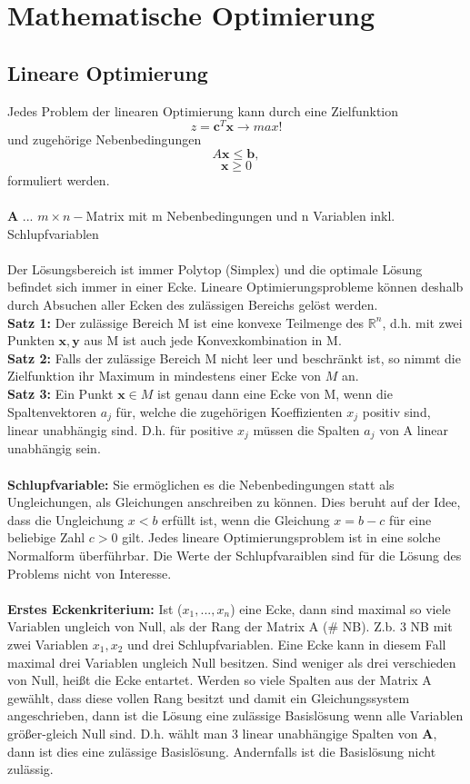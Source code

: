 \section{Mathematische Optimierung}
	\subsection{Lineare Optimierung}
		Jedes Problem der linearen Optimierung kann durch eine Zielfunktion
		\[z = \bm{c}^{T}\bm{x}\rightarrow max!\]
		und zugehörige Nebenbedingungen
		\[A\bm{x} \leq \bm{b},\]
		\[\bm{x} \geq 0\]
		formuliert werden.\\\\
		\tab[1cm] \textbf{A} \tab ... \tab $ m\times n- $Matrix mit m Nebenbedingungen und n Variablen inkl. Schlupfvariablen
		\leavevmode \\\\
		Der Lösungsbereich ist immer Polytop (Simplex) und die optimale Lösung befindet sich immer in einer Ecke. Lineare Optimierungsprobleme können deshalb durch Absuchen aller Ecken des zulässigen Bereichs gelöst werden.\\
		\textbf{Satz 1:} Der zulässige Bereich M ist eine konvexe Teilmenge des $ \mathbb{R}^{n} $, d.h. mit zwei Punkten $ \bm{x,y} $ aus M ist auch jede Konvexkombination in M.\\
		\textbf{Satz 2:} Falls der zulässige Bereich M nicht leer und beschränkt ist, so nimmt die Zielfunktion ihr Maximum in mindestens einer Ecke von $ M $ an. \\
		\textbf{Satz 3:} Ein Punkt $ \bm{x} \in M $ ist genau dann eine Ecke von M, wenn die Spaltenvektoren $ a_{j} $ für, welche die zugehörigen Koeffizienten $ x_{j} $ positiv sind, linear unabhängig sind. D.h. für positive $ x_{j} $ müssen die Spalten $ a_{j} $ von A linear unabhängig sein.
		\leavevmode \\\\
		\textbf{Schlupfvariable:} Sie ermöglichen es die Nebenbedingungen statt als Ungleichungen, als Gleichungen anschreiben zu können. Dies beruht auf der Idee, dass die Ungleichung $ x<b $ erfüllt ist, wenn die Gleichung $ x=b-c $ für eine beliebige Zahl $ c>0 $ gilt. Jedes lineare Optimierungsproblem ist in eine solche Normalform überführbar. Die Werte der Schlupfvaraiblen sind für die Lösung des Problems nicht von Interesse.
		\leavevmode \\\\
		\textbf{Erstes Eckenkriterium:} Ist ($ x_{1}, ...,x_{n} $) eine Ecke, dann sind maximal so viele Variablen ungleich von Null, als der Rang der Matrix A (\# NB). Z.b. 3 NB mit zwei Variablen $ x_{1}, x_{2} $ und drei Schlupfvariablen. Eine Ecke kann in diesem Fall maximal drei Variablen ungleich Null besitzen. Sind weniger als drei verschieden von Null, heißt die Ecke entartet. Werden so viele Spalten aus der Matrix A gewählt, dass diese vollen Rang besitzt und damit ein Gleichungssystem angeschrieben, dann ist die Lösung eine zulässige Basislösung wenn alle Variablen größer-gleich Null sind. D.h. wählt man 3 linear unabhängige Spalten von $ \bm{A} $, dann ist dies eine zulässige Basislösung. Andernfalls ist die Basislösung nicht zulässig.\\\\
